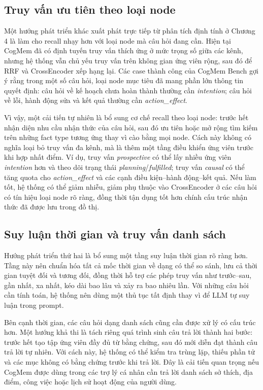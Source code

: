 \documentclass[../main.tex]{subfiles}
\begin{document}
\subsection{Truy vấn ưu tiên theo loại node}

Một hướng phát triển khác xuất phát trực tiếp từ phân tích định tính ở Chương 4 là làm cho recall nhạy hơn với loại node mà câu hỏi đang cần. Hiện tại CogMem đã có định tuyến truy vấn thích ứng ở mức trọng số giữa các kênh, nhưng hệ thống vẫn chủ yếu truy vấn trên không gian ứng viên rộng, sau đó để RRF và CrossEncoder xếp hạng lại. Các case thành công của CogMem Bench gợi ý rằng trong một số câu hỏi, loại node mục tiêu đã mang phần lớn thông tin quyết định: câu hỏi về kế hoạch chưa hoàn thành thường cần \textit{intention}; câu hỏi về lỗi, hành động sửa và kết quả thường cần \textit{action\_effect}.

Vì vậy, một cải tiến tự nhiên là bổ sung cơ chế recall theo loại node: trước hết nhận diện nhu cầu nhận thức của câu hỏi, sau đó ưu tiên hoặc mở rộng tìm kiếm trên những fact type tương ứng thay vì cào bằng mọi node. Cách này không có nghĩa loại bỏ truy vấn đa kênh, mà là thêm một tầng điều khiển ứng viên trước khi hợp nhất điểm. Ví dụ, truy vấn \textit{prospective} có thể lấy nhiều ứng viên \textit{intention} hơn và theo dõi trạng thái \textit{planning}/\textit{fulfilled}; truy vấn \textit{causal} có thể tăng quota cho \textit{action\_effect} và các cạnh điều kiện--hành động--kết quả. Nếu làm tốt, hệ thống có thể giảm nhiễu, giảm phụ thuộc vào CrossEncoder ở các câu hỏi có tín hiệu loại node rõ ràng, đồng thời tận dụng tốt hơn chính cấu trúc nhận thức đã được lưu trong đồ thị.

\subsection{Suy luận thời gian và truy vấn danh sách}

Hướng phát triển thứ hai là bổ sung một tầng suy luận thời gian rõ ràng hơn. Tầng này nên chuẩn hóa tất cả mốc thời gian về dạng có thể so sánh, lưu cả thời gian tuyệt đối và tương đối, đồng thời hỗ trợ các phép truy vấn như trước--sau, gần nhất, xa nhất, kéo dài bao lâu và xảy ra bao nhiêu lần. Với những câu hỏi cần tính toán, hệ thống nên dùng một thủ tục tất định thay vì để LLM tự suy luận trong prompt.

Bên cạnh thời gian, các câu hỏi dạng danh sách cũng cần được xử lý có cấu trúc hơn. Một hướng khả thi là tách riêng quá trình sinh câu trả lời thành hai bước: trước hết tạo tập ứng viên đầy đủ từ bằng chứng, sau đó mới diễn đạt thành câu trả lời tự nhiên. Với cách này, hệ thống có thể kiểm tra trùng lặp, thiếu phần tử và các mục không có bằng chứng trước khi trả lời. Đây là cải tiến quan trọng nếu CogMem được dùng trong các trợ lý cá nhân cần trả lời danh sách sở thích, địa điểm, công việc hoặc lịch sử hoạt động của người dùng.
\end{document}
